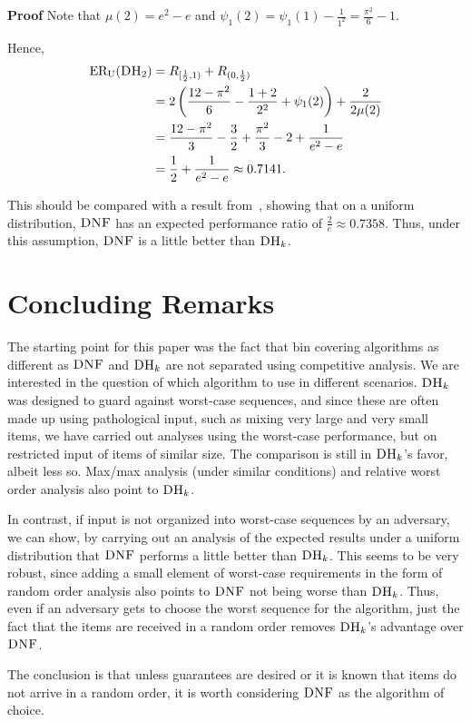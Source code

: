 \documentclass[11pt]{article}
\newenvironment{proof}{\begin{trivlist}\item[]{\bf Proof }}{\hspace*{\fill}\raisebox{-1pt}{\boldmath$\Box$}\end{trivlist}}
\newcommand{\DNF}{\ensuremath{\operatorname{\textsc{DNF}}}\xspace}
\newcommand{\DHk}{{\ensuremath{\textsc{DH}_k}}\xspace}
\newcommand{\DHtwo}{{\ensuremath{\textsc{DH}_{2}}}\xspace}
\newcommand{\RDNFtwo}{\ensuremath{R_{(0,\frac{1}{2})}}\xspace}
\newcommand{\RHartwo}{\ensuremath{R_{[\frac{1}{2},1)}}\xspace}
\newcommand{\gf}{\ensuremath{\psi_1}\xspace}
\newcommand{\ERU}[1]{\ensuremath{\mathrm{ER_U}(#1)}\xspace}
\begin{document}
\begin{proof}
Note that $\mu(2) = e^2-e$ 
and $\gf(2) = \gf(1) - \frac{1}{1^2} = \frac{\pi^2}{6} - 1$.

Hence, 
 \begin{align*}
   \ERU{\DHtwo} 
 & = \RHartwo + \RDNFtwo \\
 & = 2 \left( \frac{12-\pi^2}{6} - \frac{1+2}{2^2} + \gf(2) \right) + 
     \frac{2}{2\mu(2)}\\
 & = \frac{12-\pi^2}{3} - \frac{3}{2} + \frac{\pi^2}{3} - 2 + 
     \frac{1}{e^2-e} \\
 & = \frac{1}{2} + \frac{1}{e^2-e} \approx 0.7141.
 \end{align*}
\end{proof}

This should be compared with a result from~\cite{CFGK91}, showing
that on a uniform distribution,
\DNF has an expected performance ratio of $\frac{2}{e}\approx 0.7358$.
Thus, under this assumption, \DNF is a little better than \DHk.



\section{Concluding Remarks}
The starting point for this paper was the fact that bin covering
algorithms as different as \DNF and \DHk are not separated using
competitive analysis.
We are interested in the question of which algorithm to use in different
scenarios. \DHk was designed to guard against worst-case sequences,
and since these are often made up using pathological input, such as mixing very
large and very small items, we have carried out analyses using the
worst-case performance, but on restricted input of items of similar size.
The comparison is still in \DHk's favor, albeit less so.
Max/max analysis (under similar conditions) and relative worst order
analysis also point to \DHk.

In contrast, if input is not organized into worst-case sequences by
an adversary, we can show, by carrying out an analysis of the expected
results under a uniform distribution that \DNF performs a little
better than \DHk. This seems to be very robust, since adding a small
element of worst-case requirements in the form of random order analysis
also points to \DNF not being worse than \DHk. Thus, even if an adversary
gets to choose the worst sequence for the algorithm, just the fact that
the items are received in a random order removes
\DHk's advantage over \DNF.

The conclusion is that unless guarantees are desired or it is known that
items do not arrive in a random order, it is worth considering \DNF
as the algorithm of choice.
\end{document}
